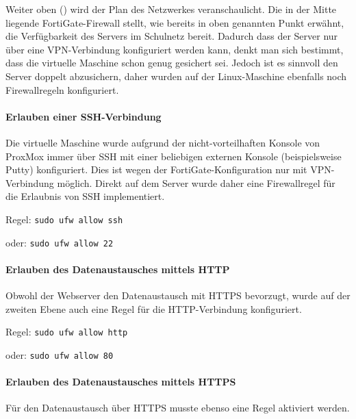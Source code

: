 \documentclass[
]{article}
\begin{document}
Weiter oben () wird der Plan des
Netzwerkes veranschaulicht. Die in der Mitte liegende FortiGate-Firewall
stellt, wie bereits in oben genannten Punkt erwähnt, die Verfügbarkeit
des Servers im Schulnetz bereit. Dadurch dass der Server nur über eine
VPN-Verbindung konfiguriert werden kann, denkt man sich bestimmt, dass
die virtuelle Maschine schon genug gesichert sei. Jedoch ist es sinnvoll
den Server doppelt abzusichern, daher wurden auf der Linux-Maschine
ebenfalls noch Firewallregeln konfiguriert.

\hypertarget{erlauben-einer-ssh-verbindung}{%
\paragraph{Erlauben einer
SSH-Verbindung}\label{erlauben-einer-ssh-verbindung}}

Die virtuelle Maschine wurde aufgrund der nicht-vorteilhaften Konsole
von ProxMox immer über SSH mit einer beliebigen externen Konsole
(beispielsweise Putty) konfiguriert. Dies ist wegen der
FortiGate-Konfiguration nur mit VPN-Verbindung möglich. Direkt auf dem
Server wurde daher eine Firewallregel für die Erlaubnis von SSH
implementiert.

Regel: \texttt{sudo\ ufw\ allow\ ssh}

oder: \texttt{sudo\ ufw\ allow\ 22}

\hypertarget{erlauben-des-datenaustausches-mittels-http}{%
\paragraph{Erlauben des Datenaustausches mittels
HTTP}\label{erlauben-des-datenaustausches-mittels-http}}

Obwohl der Webserver den Datenaustausch mit HTTPS bevorzugt, wurde auf
der zweiten Ebene auch eine Regel für die HTTP-Verbindung konfiguriert.

Regel: \texttt{sudo\ ufw\ allow\ http}

oder: \texttt{sudo\ ufw\ allow\ 80}

\hypertarget{erlauben-des-datenaustausches-mittels-https}{%
\paragraph{Erlauben des Datenaustausches mittels
HTTPS}\label{erlauben-des-datenaustausches-mittels-https}}

Für den Datenaustausch über HTTPS musste ebenso eine Regel aktiviert
werden.
\end{document}
